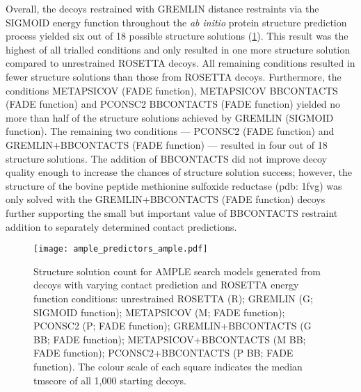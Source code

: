 Overall, the decoys restrained with GREMLIN distance restraints via the SIGMOID energy function throughout the \textit{ab initio} protein structure prediction process yielded six out of 18 possible structure solutions (\cref{fig:ample_predictor_ample}). This result was the highest of all trialled conditions and only resulted in one more structure solution compared to unrestrained ROSETTA decoys. All remaining conditions resulted in fewer structure solutions than those from ROSETTA decoys. Furthermore, the conditions METAPSICOV (FADE function), METAPSICOV BBCONTACTS (FADE function) and PCONSC2 BBCONTACTS (FADE function) yielded no more than half of the structure solutions achieved by GREMLIN (SIGMOID function). The remaining two conditions --- PCONSC2 (FADE function) and GREMLIN+BBCONTACTS (FADE function) --- resulted in four out of 18 structure solutions. The addition of BBCONTACTS did not improve decoy quality enough to increase the chances of structure solution success; however, the structure of the bovine peptide methionine sulfoxide reductase (\gls{pdb}: 1fvg) was only solved with the GREMLIN+BBCONTACTS (FADE function) decoys further supporting the small but important value of BBCONTACTS restraint addition to separately determined contact predictions.

\begin{figure}[H]
    \centering
    \texttt{[image: ample\_predictors\_ample.pdf]}
    \caption[Structure solution count forom AMPLE-derived search models]{Structure solution count for AMPLE search models generated from decoys with varying contact prediction and ROSETTA energy function conditions: unrestrained ROSETTA (R); GREMLIN (G; SIGMOID function); METAPSICOV (M; FADE function); PCONSC2  (P; FADE function); GREMLIN+BBCONTACTS (G BB; FADE function); METAPSICOV+BBCONTACTS (M BB; FADE function); PCONSC2+BBCONTACTS (P BB; FADE function). The colour scale of each square indicates the median \gls{tmscore} of all 1,000 starting decoys.}
    \label{fig:ample_predictor_ample}
\end{figure}

